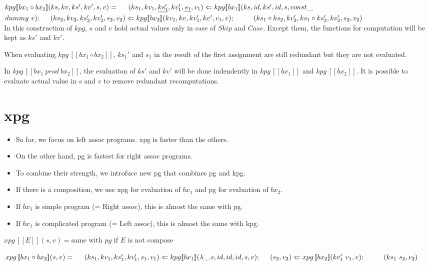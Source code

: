 \documentclass[runningheads]{llncs}
\newcommand{\tab}{\hspace*{5mm}}
\newcommand{\qtab}{\hspace*{5mm} \ \quad}
\newcommand{\kpg}[7]{kpg [\![#1]\!] (#2, #3, #4, #5, #6, #7)}
\newcommand{\kpginline}[1]{kpg \, [\![#1]\!]}
\newcommand{\xpg}[3]{xpg \, [\![#1]\!] (#2, #3)}
\begin{document}
$\kpg{bx_1 \circ bx_2}{ks}{kv}{ks'}{kv'}{s}{v} =\\
    \tab (ks_1, kv_1, \underline{ks_1'}, kv_1', \underline{s_1}, v_1) \Leftarrow \kpg{bx_1}{ks}{id}{ks'}{id}{s}{const$\_$dummy \ v};\\
    \tab (ks_2, kv_2, ks_2', kv_2', s_2, v_2) \Leftarrow \kpg{bx_2}{kv_1}{kv}{kv_1'}{kv'}{v_1}{v};\\
    \qtab (ks_1 \circ ks_2, kv_2', ks_1 \circ ks_2', kv_2', s_2, v_2)$\\

In this construction of $kpg$, $s$ and $v$ hold actual values only in case of $Skip$ and $Case$. Except them, the functions for computation will be kept as $ks'$ and $kv'$.
    
When evaluating $\kpginline{bx_1 \circ bx_2}$, $ks_1'$ and $s_1$ in the result of the first assignment are still redundant but they are not evaluated. 

In $\kpginline{bx_1 \ prod \ bx_2}$, the evaluation of $ks'$ and $kv'$ will be done indendently in $\kpginline{bx_1}$ and $\kpginline{bx_2}$. It is possible to evaluate actual value in $s$ and $v$ to remove redundant recomputations.

\section{xpg}

\begin{itemize}
\item So far, we focus on left assoc programs. xpg is faster than the others.
\item On the other hand, pg is fastest for right assoc programs.
\item To combine their strength, we introfuce new pg that combines pg and kpg.
\item If there is a composition, we use xpg for evaluation of $bx_1$ and pg for evaluation of $bx_2$.
\item If $bx_1$ is simple program (= Right assoc), this is almost the same with pg.
\item If $bx_1$ is complicated program (= Left assoc), this is almost the same with kpg.
\end{itemize}

$\xpg{E}{s}{v} = \text{same with } pg \text{ if } E \text{ is not compose}$

$\xpg{bx_1 \circ bx_2}{s}{v} =\\
    \tab (ks_1,kv_1, ks_1', kv_1', s_1, v_1) \Leftarrow \kpg{bx_1}{\lambda \_.s}{id}{id}{id}{s}{v};\\
    \tab (s_2, v_2) \Leftarrow \xpg{bx_2}{kv_1' \ v_1}{v};\\
    \qtab (ks_1 \ s_2, v_2)$
\end{document}
